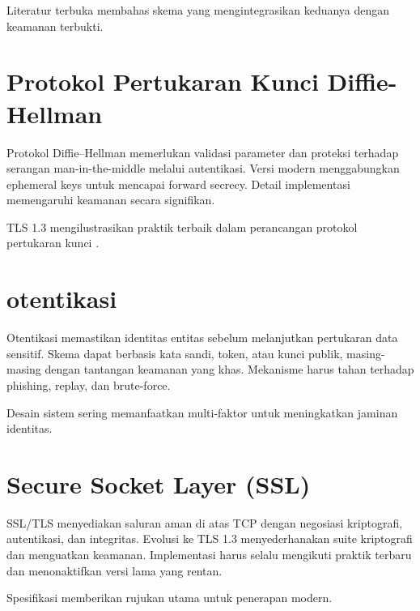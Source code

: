 \documentclass[../main.tex]{subfiles}
\begin{document}
Literatur terbuka membahas skema yang mengintegrasikan keduanya dengan keamanan terbukti.

\section{Protokol Pertukaran Kunci Diffie-Hellman}
Protokol Diffie--Hellman memerlukan validasi parameter dan proteksi terhadap serangan man-in-the-middle melalui autentikasi. Versi modern menggabungkan ephemeral keys untuk mencapai forward secrecy. Detail implementasi memengaruhi keamanan secara signifikan.

TLS 1.3 mengilustrasikan praktik terbaik dalam perancangan protokol pertukaran kunci \parencite{rfc8446}.

\section{otentikasi}
Otentikasi memastikan identitas entitas sebelum melanjutkan pertukaran data sensitif. Skema dapat berbasis kata sandi, token, atau kunci publik, masing-masing dengan tantangan keamanan yang khas. Mekanisme harus tahan terhadap phishing, replay, dan brute-force.

Desain sistem sering memanfaatkan multi-faktor untuk meningkatkan jaminan identitas.

\section{Secure Socket Layer (SSL)}
SSL/TLS menyediakan saluran aman di atas TCP dengan negosiasi kriptografi, autentikasi, dan integritas. Evolusi ke TLS 1.3 menyederhanakan suite kriptografi dan menguatkan keamanan. Implementasi harus selalu mengikuti praktik terbaru dan menonaktifkan versi lama yang rentan.

Spesifikasi \textcite{rfc8446} memberikan rujukan utama untuk penerapan modern.
\end{document}
